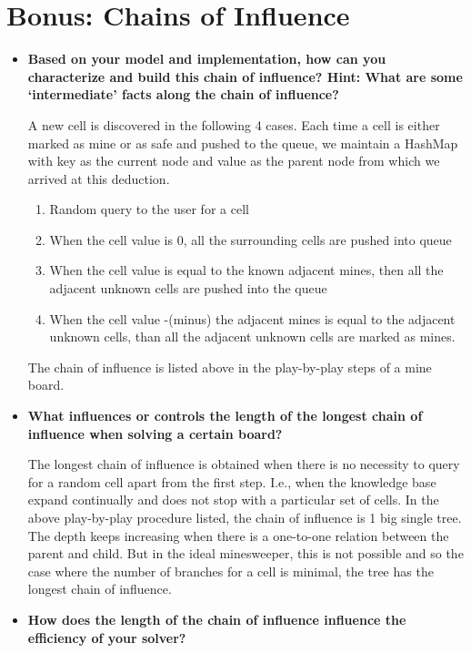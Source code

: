 \section{\textbf{Bonus: Chains of Influence}}
\begin{itemize}
\item 
\textbf{Based on your model and implementation, how can you characterize and build this chain of influence? Hint: What are some `intermediate' facts along the chain of influence?}

A new cell is discovered in the following 4 cases. Each time a cell is either marked as mine or as safe and pushed to the queue, we maintain a HashMap with key as the current node and value as the parent node from which we arrived at this deduction.

\begin{enumerate}
\item Random query to the user for a cell
\item When the cell value is 0, all the surrounding cells are pushed into queue
\item When the cell value is equal to the known adjacent mines, then all the adjacent unknown cells are pushed into the queue
\item When the cell value -(minus) the adjacent mines is equal to the adjacent unknown cells, than all the adjacent unknown cells are marked as mines.
\end{enumerate}

The chain of influence is listed above in the play-by-play steps of a mine board.

\item
\textbf{What influences or controls the length of the longest chain of influence when solving a certain board?}

The longest chain of influence is obtained when there is no necessity to query for a random cell apart from the first step. I.e., when the knowledge base expand continually and does not stop with a particular set of cells. In the above play-by-play procedure listed, the chain of influence is 1 big single tree. The depth keeps increasing when there is a one-to-one relation between the parent and child. But in the ideal minesweeper, this is not possible and so the case where the number of branches for a cell is minimal, the tree has the longest chain of influence.

\item
\textbf{How does the length of the chain of influence influence the efficiency of your solver?}


\end{itemize}
